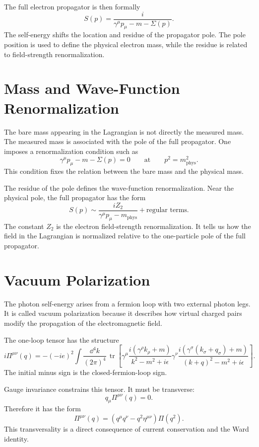 The full electron propagator is then formally
\[
    S(p)
    = \frac{i}{\gamma^\mu p_\mu-m-\Sigma(p)}.
\]
The self-energy shifts the location and residue of the propagator pole. The pole
position is used to define the physical electron mass, while the residue is
related to field-strength renormalization.

\section{Mass and Wave-Function Renormalization}

The bare mass appearing in the Lagrangian is not directly the measured mass. The
measured mass is associated with the pole of the full propagator. One imposes a
renormalization condition such as
\[
    \gamma^\mu p_\mu-m-\Sigma(p)=0
    \qquad \text{at} \qquad p^2=m_{\mathrm{phys}}^2.
\]
This condition fixes the relation between the bare mass and the physical mass.

The residue of the pole defines the wave-function renormalization. Near the
physical pole, the full propagator has the form
\[
    S(p)\sim \frac{iZ_2}{\gamma^\mu p_\mu-m_{\mathrm{phys}}}
    +\text{regular terms}.
\]
The constant \(Z_2\) is the electron field-strength renormalization. It tells us
how the field in the Lagrangian is normalized relative to the one-particle pole
of the full propagator.

\section{Vacuum Polarization}

The photon self-energy arises from a fermion loop with two external photon legs.
It is called vacuum polarization because it describes how virtual charged pairs
modify the propagation of the electromagnetic field.

The one-loop tensor has the structure
\[
    i\Pi^{\mu\nu}(q)
    = -(-ie)^2\int\frac{\dd^4k}{(2\pi)^4}\,
      \operatorname{tr}\left[
      \gamma^\mu\frac{i(\gamma^\rho k_\rho+m)}{k^2-m^2+i\epsilon}
      \gamma^\nu\frac{i(\gamma^\sigma(k_\sigma+q_\sigma)+m)}{(k+q)^2-m^2+i\epsilon}
      \right].
\]
The initial minus sign is the closed-fermion-loop sign.

Gauge invariance constrains this tensor. It must be transverse:
\[
    q_\mu\Pi^{\mu\nu}(q)=0.
\]
Therefore it has the form
\[
    \Pi^{\mu\nu}(q)
    = (q^\mu q^\nu-q^2\eta^{\mu\nu})\Pi(q^2).
\]
This transversality is a direct consequence of current conservation and the Ward
identity.


